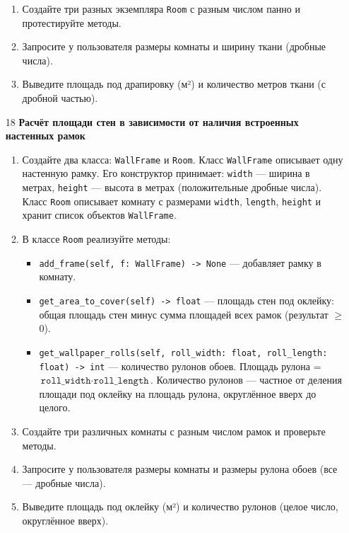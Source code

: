 \begin{enumerate}
\begin{enumerate}
    \item Создайте три разных экземпляра \texttt{Room} с разным числом панно и протестируйте методы.

    \item Запросите у пользователя размеры комнаты и ширину ткани (дробные числа).

    \item Выведите площадь под драпировку (м²) и количество метров ткани (с дробной частью).
\end{enumerate}

\item[18] \textbf{Расчёт площади стен в зависимости от наличия встроенных настенных рамок}
\begin{enumerate}
    \item Создайте два класса: \texttt{WallFrame} и \texttt{Room}.  
    Класс \texttt{WallFrame} описывает одну настенную рамку. Его конструктор принимает:  
    \texttt{width} — ширина в метрах,  
    \texttt{height} — высота в метрах (положительные дробные числа).  
    Класс \texttt{Room} описывает комнату с размерами \texttt{width}, \texttt{length}, \texttt{height} и хранит список объектов \texttt{WallFrame}.

    \item В классе \texttt{Room} реализуйте методы:  
    \begin{itemize}
        \item \texttt{add\_frame(self, f: WallFrame) -> None} — добавляет рамку в комнату.
        \item \texttt{get\_area\_to\_cover(self) -> float} — площадь стен под оклейку: общая площадь стен минус сумма площадей всех рамок (результат $\geqslant$ 0).
        \item \texttt{get\_wallpaper\_rolls(self, roll\_width: float, roll\_length: float) -> int} — количество рулонов обоев. Площадь рулона = \(\texttt{roll\_width} \cdot \texttt{roll\_length}\). Количество рулонов — частное от деления площади под оклейку на площадь рулона, округлённое вверх до целого.
    \end{itemize}

    \item Создайте три различных комнаты с разным числом рамок и проверьте методы.

    \item Запросите у пользователя размеры комнаты и размеры рулона обоев (все — дробные числа).

    \item Выведите площадь под оклейку (м²) и количество рулонов (целое число, округлённое вверх).
\end{enumerate}


\end{enumerate}

